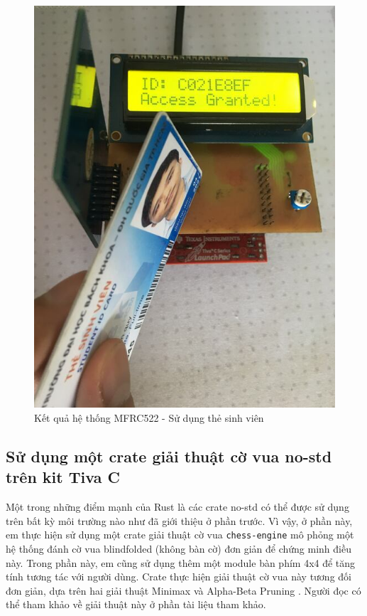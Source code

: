 \begin{figure}[ht]
\centering
\includegraphics[scale=0.3]{images/mfrc522_student.jpg}
\caption{Kết quả hệ thống MFRC522 - Sử dụng thẻ sinh viên}
\label{fig:rc522_student}
\end{figure}

\clearpage
\subsection{Sử dụng một crate giải thuật cờ vua no-std trên kit Tiva C}\label{lbl:rust_chess}
Một trong những điểm mạnh của Rust là các crate no-std có thể được sử dụng trên bất kỳ môi trường nào như đã giới thiệu ở phần trước.
Vì vậy, ở phần này, em thực hiện sử dụng một crate giải thuật cờ vua \texttt{chess-engine} \cite{rust_chess_engine} mô phỏng một hệ thống đánh cờ vua blindfolded (không bàn cờ) đơn giản để chứng minh điều này.
Trong phần này, em cũng sử dụng thêm một module bàn phím 4x4 để tăng tính tương tác với người dùng.
Crate thực hiện giải thuật cờ vua này tương đối đơn giản, dựa trên hai giải thuật Minimax \cite{minimax_chess_programming} và Alpha-Beta Pruning \cite{alpha_beta_chess_programming}.
Người đọc có thể tham khảo về giải thuật này ở phần tài liệu tham khảo.

